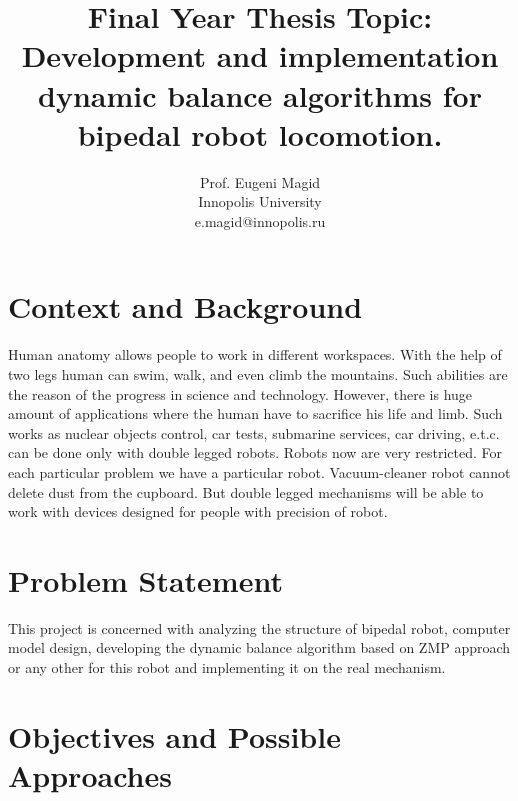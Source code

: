 \documentclass[11pt,a4paper]{article}
\begin{document}
 
\title{Final Year Thesis Topic:\\Development and implementation dynamic balance algorithms for bipedal robot locomotion.}
\author{Prof. Eugeni Magid\\\vspace{-4mm}Innopolis University\\e.magid@innopolis.ru}
\date{}

\maketitle

\section{Context and Background}

Human anatomy allows people to work in different workspaces. With the help of two legs human can swim, walk, and even climb the mountains. Such abilities are the reason of the progress in science and technology. However, there is huge amount of  applications where the human have to sacrifice his life and limb. Such works as nuclear objects control, car tests, submarine services, car driving, e.t.c. can be done only with double legged robots. Robots now are very restricted. For each particular problem we have a particular robot. Vacuum-cleaner robot cannot delete dust from the cupboard. But double legged mechanisms will be able to work with devices designed for people with precision of robot. 

\section{Problem Statement}

This project is concerned with analyzing the structure of bipedal robot, computer model design, developing the dynamic balance algorithm based on ZMP approach or any other for this robot and implementing it on the real mechanism.  

\section{Objectives and Possible Approaches}
\end{document}
